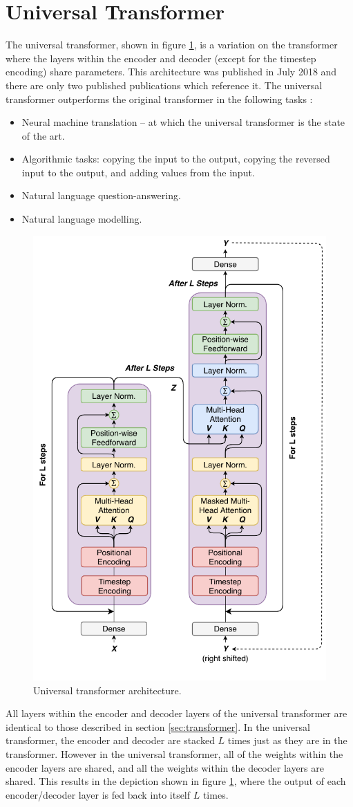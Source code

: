 \section{Universal Transformer} \label{sec:universal_transformer}
The universal transformer, shown in figure \ref{fig:universal_transformer}, is a variation on the transformer where the layers within the encoder and decoder (except for the timestep encoding) share parameters.
This architecture was published in July 2018 \cite{Dehghani2018} and there are only two published publications which reference it.
The universal transformer outperforms the original transformer in the following tasks \cite{Dehghani2018}:
\begin{itemize}
	\item Neural machine translation -- at which the universal transformer is the state of the art.
	\item Algorithmic tasks: copying the input to the output, copying the reversed input to the output, and adding values from the input.
	\item Natural language question-answering.
	\item Natural language modelling.
\end{itemize}

\begin{figure}[htbp]
	\centerline{\includegraphics[width=.5\textwidth]{images/universal_transformer.pdf}}
	\caption{Universal transformer architecture.}
	\label{fig:universal_transformer}
\end{figure}

All layers within the encoder and decoder layers of the universal transformer are identical to those described in section \ref{sec:transformer}.
In the universal transformer, the encoder and decoder are stacked $L$ times just as they are in the transformer.
However in the universal transformer, all of the weights within the encoder layers are shared, and all the weights within the decoder layers are shared.
This results in the depiction shown in figure \ref{fig:universal_transformer}, where the output of each encoder/decoder layer is fed back into itself $L$ times.

